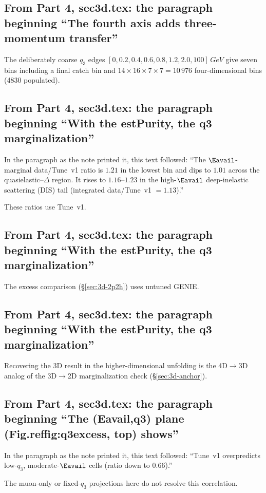 \subsection{From Part 4, sec3d.tex: the paragraph beginning ``The fourth axis adds three-momentum transfer''}
The deliberately coarse $q_{3}$ edges $[0,0.2,0.4,0.6,0.8,1.2,2.0,100]\,\si{GeV}$ give seven bins including a final catch bin and $14\times16\times7\times7=10\,976$ four-dimensional bins (4830 populated).

\subsection{From Part 4, sec3d.tex: the paragraph beginning ``With the estPurity, the q3 marginalization''}
In the paragraph as the note printed it, this text followed: ``The $\Eavail$-marginal data/Tune~v1 ratio is $1.21$ in the lowest bin and dips to $1.01$ across the quasielastic--$\Delta$ region. It rises to $1.16$--$1.23$ in the high-$\Eavail$ deep-inelastic scattering (DIS) tail (integrated data/Tune~v1 $=1.13$).''\par
These ratios use Tune~v1.

\subsection{From Part 4, sec3d.tex: the paragraph beginning ``With the estPurity, the q3 marginalization''}
The excess comparison (\S\ref{sec:3d-2p2h}) uses untuned GENIE.

\subsection{From Part 4, sec3d.tex: the paragraph beginning ``With the estPurity, the q3 marginalization''}
Recovering the 3D result in the higher-dimensional unfolding is the 4D$\to$3D analog of the 3D$\to$2D marginalization check (\S\ref{sec:3d-anchor}).

\subsection{From Part 4, sec3d.tex: the paragraph beginning ``The (Eavail,q3) plane (Fig.reffig:q3excess, top) shows''}
In the paragraph as the note printed it, this text followed: ``Tune~v1 overpredicts low-$q_{3}$, moderate-$\Eavail$ cells (ratio down to $0.66$).''\par
The muon-only or fixed-$q_{3}$ projections here do not resolve this correlation.

